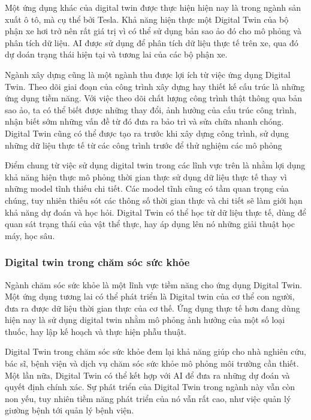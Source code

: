 Một ứng dụng khác của digital twin được thực hiện hiện nay là trong ngành sản xuất ô tô, mà cụ thể bởi Tesla. Khả năng hiện thực một Digital Twin của bộ phận xe hơi trở nên rất giá trị vì có thể sử dụng bản sao ảo đó cho mô phỏng và phân tích dữ liệu. AI được sử dụng để phân tích dữ liệu thực tế trên xe, qua đó dự doán trạng thái hiện tại và tương lai của các bộ phận xe.

Ngành xây dựng cũng là một ngành thu được lợi ích từ việc ứng dụng Digital Twin. Theo dõi giai đoạn của công trình xây dựng hay thiết kế cấu trúc là những ứng dụng tiềm năng. Với việc theo dõi chất lượng công trình thật thông qua bản sao ảo, ta có thể biết được những thay đổi, ảnh hưởng của cấu trúc công trình, nhận biết sớm những vấn đề từ đó đưa ra bảo trì và sửa chữa nhanh chóng. Digital Twin cũng có thể được tạo ra trước khi xây dựng công trình, sử dụng những dữ liệu thực tế từ các công trình trước để thử nghiệm các mô phỏng

Điểm chung từ việc sử dụng digital twin trong các lĩnh vực trên là nhằm lợi dụng khả năng hiện thực mô phỏng thời gian thực sử dụng dữ liệu thực tế thay vì những model tĩnh thiếu chi tiết. Các model tĩnh cũng có tầm quan trọng của chúng, tuy nhiên thiếu sót các thông số thời gian thực và chi tiết sẽ làm giới hạn khả năng dự đoán và học hỏi. Digital Twin có thể học từ dữ liệu thực tế, dùng để quan sát trạng thái của vật thể thực, hay áp dụng lên nó những giải thuật học máy, học sâu.

\subsubsection{Digital twin trong chăm sóc sức khỏe}

Ngành chăm sóc sức khỏe là một lĩnh vực tiềm năng cho ứng dụng Digital Twin. Một ứng dụng tương lai có thể phát triển là Digital twin của cơ thể con người, đưa ra được dữ liệu thời gian thực của cơ thế. Ứng dụng thực tế hơn đang dùng hiện nay là sử dụng digital twin nhằm mô phỏng ảnh hưởng của một số loại thuốc, hay lập kế hoạch và thực hiện phẫu thuật.

Digital Twin trong chăm sóc sức khỏe đem lại khả năng giúp cho nhà nghiên cứu, bác sĩ, bệnh viện và dịch vụ chăm sóc sức khỏe mô phỏng môi trường cần thiết. Một lần nữa, Digital Twin có thể kết hợp với AI để đưa ra những dự đoán và quyết định chính xác. Sự phát triển của Digital Twin trong ngành này vẫn còn non yếu, tuy nhiên tiềm năng phát triển của nó vẫn rất cao, như việc quản lý giường bệnh tới quản lý bệnh viện.

